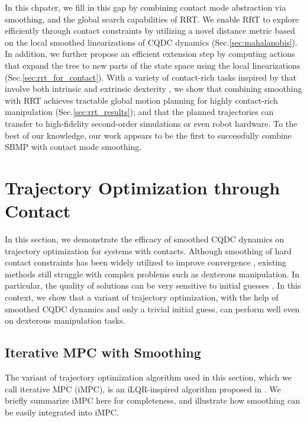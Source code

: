 In this chpater, we fill in this gap by combining contact mode abstraction via smoothing, and the global search capabilities of RRT. We enable RRT to explore efficiently through contact constraints by utilizing a novel distance metric based on the local smoothed linearizations of CQDC dynamics (Sec.\ref{sec:mahalanobis}). In addition, we further propose an efficient extension step by computing actions that expand the tree to new parts of the state space using the local linearizations (Sec.\ref{sec:rrt_for_contact}). With a variety of contact-rich tasks inspired by \cite{rajeswaran2018learning} that involve both intrinsic and extrinsic dexterity \cite{extrinsic}, we show that combining smoothing with RRT achieves tractable global motion planning for highly contact-rich manipulation (Sec.\ref{sec:rrt_results}); and that the planned trajectories can transfer to high-fidelity second-order simulations or even robot hardware. To the best of our knowledge, our work appears to be the first to successfully combine SBMP with contact mode smoothing.

\section{Trajectory Optimization through Contact \label{sec:traj_opt}}
\noindent 
In this section, we demonstrate the efficacy of smoothed CQDC dynamics on trajectory optimization for systems with contacts.
Although smoothing of hard contact constraints has been widely utilized to improve convergence \cite{posa2014direct, howell2022dojo, howell2022trajectory}, existing methods still struggle with complex problems such as dexterous manipulation. In particular, the quality of solutions can be very sensitive to initial guesses \cite{onol2020tuning}.
In this context, we show that a variant of trajectory optimization, with the help of smoothed CQDC dynamics and only a trivial initial guess, can perform well even on dexterous manipulation tasks.

\subsection{Iterative MPC with Smoothing \label{sec:iMPC}}
The variant of trajectory optimization algorithm used in this section, which we call iterative MPC (iMPC), is an iLQR-inspired algorithm proposed in \cite{bundledgradients}. We briefly summarize iMPC here for completeness, and illustrate how smoothing can be easily integrated into iMPC.

